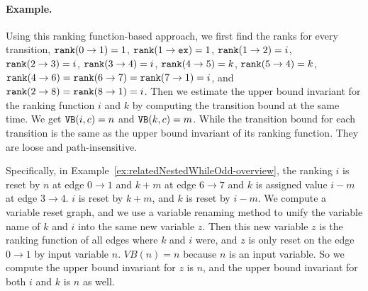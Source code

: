 \paragraph{Example.}
Using this ranking function-based approach, we first find the ranks for every transition,
$\mathtt{rank}(0 \to 1) = 1$,
$\mathtt{rank}(1 \to \mathtt{ex}) = 1$,
$\mathtt{rank}(1 \to 2) = i$,
$\mathtt{rank}(2 \to 3) = i$,
$\mathtt{rank}(3 \to 4) = i$,
$\mathtt{rank}(4 \to 5) = k$,
$\mathtt{rank}(5 \to 4) = k$,
$\mathtt{rank}(4\to 6) = \mathtt{rank}(6 \to 7) = \mathtt{rank}(7 \to 1) = i$,
and $\mathtt{rank}(2 \to 8) = \mathtt{rank}(8 \to 1) = i$.
Then we estimate the upper bound invariant for the ranking function $i$ and $k$ by computing the transition bound at the same time.
We get ${\mathtt{VB}}(i, c) = n$ and ${\mathtt{VB}}(k, c) = m$.
While the transition bound for each transition is the same as the upper bound invariant of its ranking function.
They are loose and path-insensitive. 


Specifically, in Example~\ref{ex:relatedNestedWhileOdd-overview}, the ranking $i$ is reset by $n$ at edge $0 \to 1$ and 
$k + m$ at edge $6 \to 7$ and $k$ is assigned value $i - m$ at edge $3 \to 4$. 
$i$ is reset by $k+m$, and $k$ is reset by $i - m$.
 We compute a variable reset graph, and we use a variable renaming method to unify the variable name of $k$ and $i$ into the same new variable $z$.
 Then this new variable $z$ is the ranking function of all edges where $k$ and $i$ were, and $z$ is only reset on the edge $0 \to 1$ by input variable $n$. $VB(n) = n$ because $n$ is an input variable.
 So we compute the upper bound invariant for $z$ is $n$, and
 the upper bound invariant for both $i$ and $k$ is $n$ as well.
